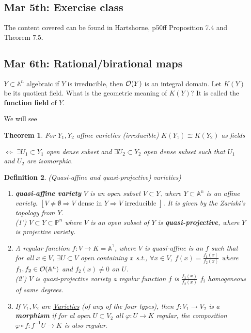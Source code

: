 \documentclass[11pt]{article}
\newtheorem{thm}{Theorem}[section]
\newtheorem{dfn}[thm]{Definition}
\newcommand{\affn}{\mathbb A}
\newcommand{\proj}{\mathbb P}
\newcommand{\calo}{{\cal O}}
\newcommand{\Lrta}{\Longrightarrow}
\newcommand{\lrta}{\longrightarrow}
\newcommand{\Llrta}{\Longleftrightarrow}
\begin{document}
\subsection{Mar 5th: Exercise class}
The content covered can be found in Hartshorne, p50ff Proposition 7.4 and Theorem 7.5.


\subsection{Mar 6th: Rational/birational maps}

$Y\subset \affn^n$ algebraic if $Y$ is irreducible, then $\calo(Y)$ is an integral domain. Let $K(Y)$ be its quotient field. What is the geometric meaning of $K(Y)$? It is called the \textbf{function field} of $Y$.

We will see
\begin{thm}
For $Y_1,Y_2$ affine varieties (irreducible) $K(Y_1)\cong K(Y_2)$ as fields

$\Llrta$ $\exists U_1\subset Y_1$ open dense subset and $\exists U_2\subset Y_2$ open dense subset such that $U_1$ and $U_2$ are isomorphic.
\end{thm}
\begin{dfn}
(Quasi-affine  and quasi-projective) varieties)
\begin{enumerate}%
  \item \textbf{quasi-affine variety} $V$ is an open subset $V\subset Y$, where $Y\subset \affn^n$ is an affine variety. $[V\neq \emptyset\Lrta V\text{ dense in } Y\Lrta V\text{ irreducible }]$. It is given by the Zariski's topology from $Y$.\\
  (1') $V\subset Y\subset \proj^n$ where $V$ is an open subset of $Y$ is \textbf{quasi-projective}, where $Y$ is projective variety.
  \item A regular function $f:V\lrta K=\affn^1$, where $V$ is quasi-affine is an $f$ such that for all $x\in V$, $\exists U\subset V$ open containing $x$ s.t., $\forall x\in V$, $f(x)=\frac{f_1(x)}{f_2(x)}$ where $f_1,f_2\in\calo(\affn^n)$ and $f_2(x)\neq 0$ on $U$.\\
  (2') $V$ is quasi-projective variety a regular function $f$ is $\frac{f_1(x)}{f_2(x)}$ $f_i$ homogeneous of same degrees.
  \item If $V_1,V_2$ are \underline{Varieties} (of any of the four types), then $f:V_1\lrta V_2$ is a \textbf{morphism} if for al open $U\subset V_2$ all $\varphi:U\lrta K$ regular, the composition $\varphi\circ f: f^{-1}U\lrta K$ is also regular.
  \end{enumerate}
\end{dfn}
\end{document}
